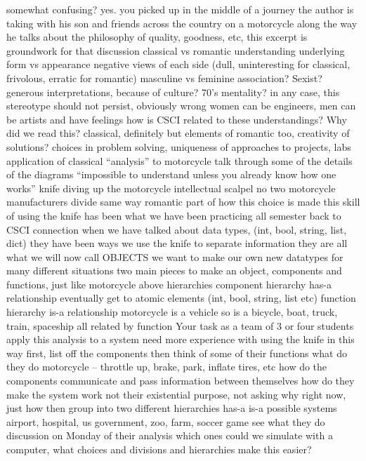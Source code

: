 \documentclass{article}
\begin{document}
somewhat confusing? yes.
you picked up in the middle of a journey the author is taking with his son
and friends across the country on a motorcycle
along the way he talks about the philosophy of quality, goodness, etc,
this excerpt is groundwork for that discussion
classical vs romantic understanding
underlying form vs appearance
negative views of each side (dull, uninteresting for classical, frivolous, erratic for romantic)
masculine vs feminine association? Sexist?
generous interpretations, because of culture? 70's mentality?
in any case, this stereotype should not persist, obviously wrong
women can be engineers, men can be artists and have feelings
how is CSCI related to these understandings? Why did we read this?
classical, definitely
but elements of romantic too, creativity of solutions?
choices in problem solving, uniqueness of approaches to projects, labs
application of classical “analysis” to motorcycle
talk through some of the details of the diagrams
“impossible to understand unless you already know how one works”
knife diving up the motorcycle
intellectual scalpel
no two motorcycle manufacturers divide same way
romantic part of how this choice is made
this skill of using the knife has been what we have been practicing all semester
back to CSCI connection
when we have talked about data types, (int, bool, string, list, dict)
they have been ways we use the knife to separate information
they are all what we will now call OBJECTS
we want to make our own new datatypes for many different situations
two main pieces to make an object, components and functions, just like motorcycle above
hierarchies
component hierarchy
has-a relationship
eventually get to atomic elements (int, bool, string, list etc)
function hierarchy
is-a relationship
motorcycle is a vehicle
so is a bicycle, boat, truck, train, spaceship
all related by function
Your task as a team of 3 or four students
apply this analysis to a system
need more experience with using the knife in this way
first, list off the components
then think of some of their functions
what do they do
motorcycle – throttle up, brake, park, inflate tires, etc
how do the components communicate and pass information between themselves
how do they make the system work
not their existential purpose, not asking why right now, just how
then group into two different hierarchies
has-a
is-a
possible systems
airport, hospital, us government, zoo, farm, soccer game
see what they do
discussion on Monday of their analysis
which ones could we simulate with a computer,
what choices and divisions and hierarchies make this easier?
\end{document}
